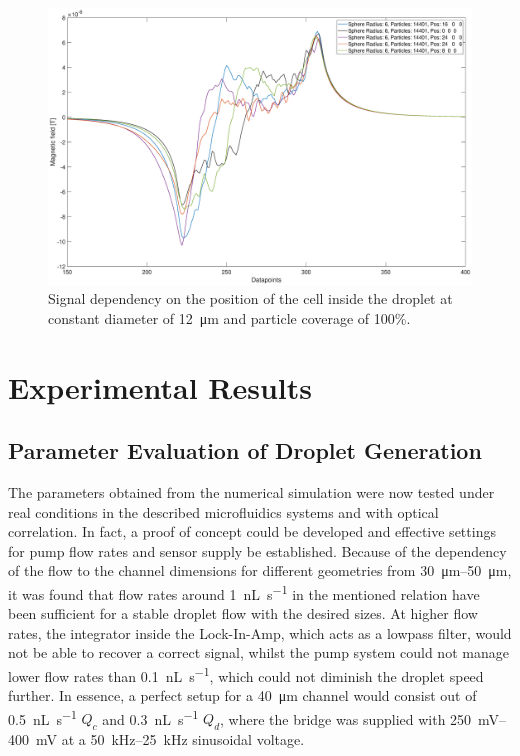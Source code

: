 \begin{figure}[h]
	\centering
	\includegraphics[clip,trim={55mm 20mm 50mm 10mm},width=\linewidth]{Ressourcen/Results/Singularity/r=6,part+pos=var}
	\caption{Signal dependency on the position of the cell inside the droplet at constant diameter of \SI{12}{\micro\meter} and particle coverage of 100\%.}
	\label{fig:sim:singularity:signal}
\end{figure}



\section{Experimental Results}
\subsection{Parameter Evaluation of Droplet Generation}
The parameters obtained from the numerical simulation were now tested under real conditions in the described microfluidics systems and with optical correlation. In fact, a proof of concept could be developed and effective settings for pump flow rates and sensor supply be established. Because of the dependency of the flow to the channel dimensions for different geometries from \SIrange{30}{50}{\micro\meter}, it was found that flow rates around \SI{1}{\nano\liter\per\second} in the mentioned relation have been sufficient for a stable droplet flow with the desired sizes. At higher flow rates, the integrator inside the Lock-In-Amp, which acts as a lowpass filter, would not be able to recover a correct signal, whilst the pump system could not manage lower flow rates than \SI{0.1}{\nano\liter\per\second}, which could not diminish the droplet speed further. In essence, a perfect setup for a \SI{40}{\micro\meter} channel would consist out of \SI{0.5}{\nano\liter\per\second} $Q_c$ and \SI{0.3}{\nano\liter\per\second} $Q_d$, where the bridge was supplied with \SIrange{250}{400}{\mV} at a \SIrange{50}{25}{\kHz} sinusoidal voltage.


